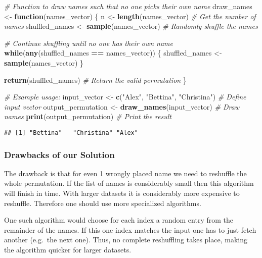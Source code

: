 \documentclass[
]{article}
\newenvironment{Shaded}{\begin{snugshade}}{\end{snugshade}}
\newcommand{\CommentTok}[1]{\textcolor[rgb]{0.56,0.35,0.01}{\textit{#1}}}
\newcommand{\ControlFlowTok}[1]{\textcolor[rgb]{0.13,0.29,0.53}{\textbf{#1}}}
\newcommand{\FunctionTok}[1]{\textcolor[rgb]{0.13,0.29,0.53}{\textbf{#1}}}
\newcommand{\NormalTok}[1]{#1}
\newcommand{\OtherTok}[1]{\textcolor[rgb]{0.56,0.35,0.01}{#1}}
\newcommand{\SpecialCharTok}[1]{\textcolor[rgb]{0.81,0.36,0.00}{\textbf{#1}}}
\newcommand{\StringTok}[1]{\textcolor[rgb]{0.31,0.60,0.02}{#1}}
\begin{document}
\begin{Shaded}
\begin{Highlighting}[]
\CommentTok{\# Function to draw names such that no one picks their own name}
\NormalTok{draw\_names }\OtherTok{\textless{}{-}} \ControlFlowTok{function}\NormalTok{(names\_vector) \{}
\NormalTok{  n }\OtherTok{\textless{}{-}} \FunctionTok{length}\NormalTok{(names\_vector)  }\CommentTok{\# Get the number of names}
\NormalTok{  shuffled\_names }\OtherTok{\textless{}{-}} \FunctionTok{sample}\NormalTok{(names\_vector)  }\CommentTok{\# Randomly shuffle the names}

  \CommentTok{\# Continue shuffling until no one has their own name}
  \ControlFlowTok{while}\NormalTok{(}\FunctionTok{any}\NormalTok{(shuffled\_names }\SpecialCharTok{==}\NormalTok{ names\_vector)) \{}
\NormalTok{    shuffled\_names }\OtherTok{\textless{}{-}} \FunctionTok{sample}\NormalTok{(names\_vector)}
\NormalTok{  \}}

  \FunctionTok{return}\NormalTok{(shuffled\_names)  }\CommentTok{\# Return the valid permutation}
\NormalTok{\}}

\CommentTok{\# Example usage:}
\NormalTok{input\_vector }\OtherTok{\textless{}{-}} \FunctionTok{c}\NormalTok{(}\StringTok{"Alex"}\NormalTok{, }\StringTok{"Bettina"}\NormalTok{, }\StringTok{"Christina"}\NormalTok{)  }\CommentTok{\# Define input vector}
\NormalTok{output\_permutation }\OtherTok{\textless{}{-}} \FunctionTok{draw\_names}\NormalTok{(input\_vector)  }\CommentTok{\# Draw names}
\FunctionTok{print}\NormalTok{(output\_permutation)  }\CommentTok{\# Print the result}
\end{Highlighting}
\end{Shaded}

\begin{verbatim}
## [1] "Bettina"   "Christina" "Alex"
\end{verbatim}

\subsubsection{Drawbacks of our
Solution}\label{drawbacks-of-our-solution}

The drawback is that for even 1 wrongly placed name we need to reshuffle
the whole permutation. If the list of names is considerably small then
this algorithm will finish in time. With larger datasets it is
considerably more expensive to reshuffle. Therefore one should use more
specialized algorithms.

One such algorithm would choose for each index a random entry from the
remainder of the names. If this one index matches the input one has to
just fetch another (e.g.~the next one). Thus, no complete reshuffling
takes place, making the algorithm quicker for larger datasets.
\end{document}
